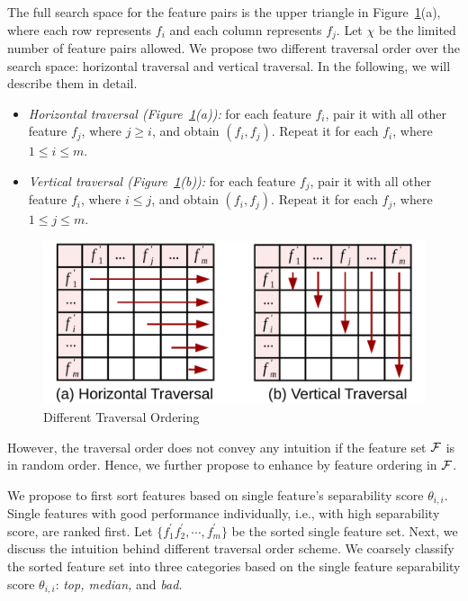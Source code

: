 The full search space for the feature pairs is the upper triangle in Figure~\ref{fig:traversal}(a), where each row represents $f_i$ and each column represents $f_j$. Let $\chi$ be the limited number of feature pairs allowed. We propose two different traversal order over the search space: horizontal traversal and vertical traversal. In the following, we will describe them in detail.
\begin{itemize}
\item \emph{Horizontal traversal (Figure~\ref{fig:traversal}(a)):} for each feature $f_i$, pair it with all other feature $f_j$, where $j\geq i$, and obtain $(f_i,f_j)$. Repeat it for each $f_i$, where $1 \leq i\leq m$.
\item \emph{Vertical traversal (Figure~\ref{fig:traversal}(b)):} for each feature $f_j$, pair it with all other feature $f_i$, where $i\leq j$, and obtain $(f_i,f_j)$. Repeat it for each $f_j$, where $1 \leq j\leq m$.
\end{itemize}

\begin{figure}[h]
  \centering
  \vspace{-5mm}
  \includegraphics[width=0.85\linewidth]{fig/traversal.pdf}
  \vspace{-5mm}
\caption{Different Traversal Ordering}
\vspace{-5mm}
\label{fig:traversal}
\end{figure} 

However, the traversal order does not convey any intuition if the feature set $\ff$ is in random order. Hence, we further propose to enhance \traversal by feature ordering in $\ff$.

 We propose to first sort features based on single feature's separability score $\theta_{i,i}$. Single features with good performance individually, i.e., with high separability score, are ranked first. Let $\{f_1^{'} f_2^{'},\cdots,f_m^{'}\}$ be the sorted single feature set. Next, we discuss the intuition behind different traversal order scheme. We coarsely classify the sorted feature set into three categories based on the single feature separability score $\theta_{i,i}$: {\em top, median,} and {\em bad}. 


